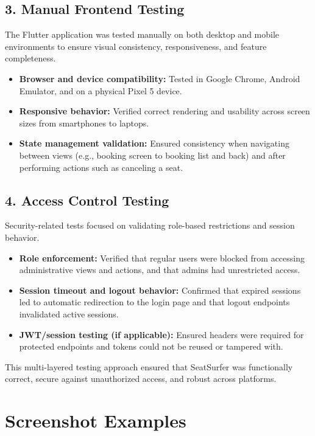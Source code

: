 \documentclass[12pt,a4paper]{report}
\begin{document}
\subsection*{3. Manual Frontend Testing}

The Flutter application was tested manually on both desktop and mobile environments to ensure visual consistency, responsiveness, and feature completeness.

\begin{itemize}
    \item \textbf{Browser and device compatibility:} Tested in Google Chrome, Android Emulator, and on a physical Pixel 5 device.
    \item \textbf{Responsive behavior:} Verified correct rendering and usability across screen sizes from smartphones to laptops.
    \item \textbf{State management validation:} Ensured consistency when navigating between views (e.g., booking screen to booking list and back) and after performing actions such as canceling a seat.
\end{itemize}

\subsection*{4. Access Control Testing}

Security-related tests focused on validating role-based restrictions and session behavior.

\begin{itemize}
    \item \textbf{Role enforcement:} Verified that regular users were blocked from accessing administrative views and actions, and that admins had unrestricted access.
    \item \textbf{Session timeout and logout behavior:} Confirmed that expired sessions led to automatic redirection to the login page and that logout endpoints invalidated active sessions.
    \item \textbf{JWT/session testing (if applicable):} Ensured headers were required for protected endpoints and tokens could not be reused or tampered with.
\end{itemize}

This multi-layered testing approach ensured that SeatSurfer was functionally correct, secure against unauthorized access, and robust across platforms.

\section{Screenshot Examples}
\end{document}
